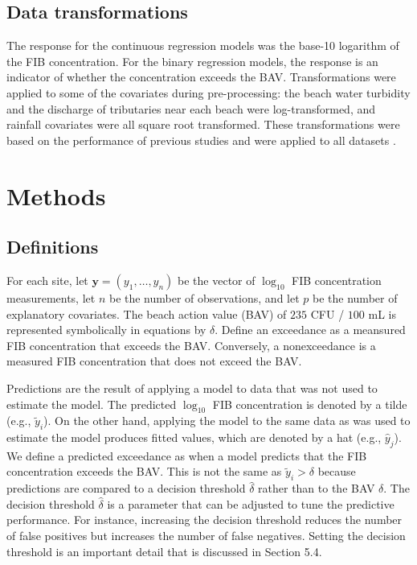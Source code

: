 \documentclass[authoryear,review, 12pt]{elsarticle}
\begin{document}
\subsection{Data transformations}\label{data-transformations}

The response for the continuous regression models was the base-10
logarithm of the FIB concentration. For the binary regression models,
the response is an indicator of whether the concentration exceeds the
BAV. Transformations were applied to some of the covariates during
pre-processing: the beach water turbidity and the discharge of
tributaries near each beach were log-transformed, and rainfall
covariates were all square root transformed. These transformations were
based on the performance of previous studies and were applied to all
datasets \citep{Ge:2007ou,Frick:2008jo}.

\section{Methods}\label{methods}

\subsection{Definitions}\label{definitions}

For each site, let \(\bm{y}=(y_1, \dots, y_n)\) be the vector of
\(\log_{10}\) FIB concentration measurements, let \(n\) be the number of
observations, and let \(p\) be the number of explanatory covariates. The
beach action value (BAV) of \(235\) CFU / \(100\) mL is represented
symbolically in equations by \(\delta\). Define an exceedance as a
meansured FIB concentration that exceeds the BAV. Conversely, a
nonexceedance is a measured FIB concentration that does not exceed the
BAV.

Predictions are the result of applying a model to data that was not used
to estimate the model. The predicted \(\log_{10}\) FIB concentration is
denoted by a tilde (e.g., \(\tilde{y}_i\)). On the other hand, applying
the model to the same data as was used to estimate the model produces
fitted values, which are denoted by a hat (e.g., \(\hat{y}_j\)). We
define a predicted exceedance as when a model predicts that the FIB
concentration exceeds the BAV. This is not the same as
\(\tilde{y}_i > \delta\) because predictions are compared to a decision
threshold \(\hat{\delta}\) rather than to the BAV \(\delta\). The
decision threshold \(\hat{\delta}\) is a parameter that can be adjusted
to tune the predictive performance. For instance, increasing the
decision threshold reduces the number of false positives but increases
the number of false negatives. Setting the decision threshold is an
important detail that is discussed in Section 5.4.
\end{document}
